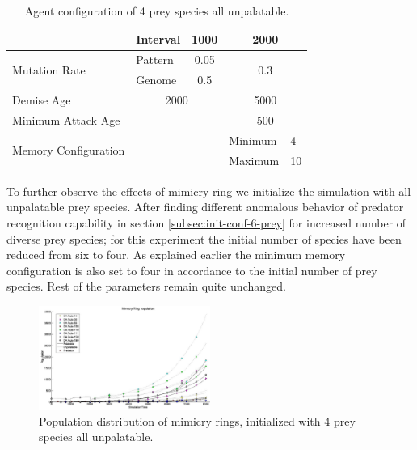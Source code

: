 \documentclass[letterpaper]{article}
\numberwithin{equation}{section}
\begin{document}
\begin{table}[h]
\begin{tabular}{| p{2cm} | p{1.5cm} | p{1cm} | p{.5cm} | p{1.5cm} | p{.5cm} |}
  						 									& Interval  & \multicolumn{2}{c|}{1000} & \multicolumn{2}{c|}{2000} \\ \hline
  \multirow{2}{*}{Mutation Rate} & Pattern   & \multicolumn{2}{c|}{0.05} & \multicolumn{2}{c|}{\multirow{2}{*}{0.3}} \\ \cline{2-4}
  						 									 & Genome    & \multicolumn{2}{c|}{0.5}  & \multicolumn{2}{c|}{} \\ \hline
  Demise Age	 									 & \multicolumn{3}{c|}{2000}							& \multicolumn{2}{c|}{5000} \\ \hline
  Minimum Attack Age						 & \multicolumn{3}{c|}{} 						    & \multicolumn{2}{c|}{500} \\ \hline
  \multirow{2}{*}{\parbox{2cm}{Memory Configuration}} & \multicolumn{3}{c|}{} 					& Minimum & 4 \\ \cline{5-6}
   																			& \multicolumn{3}{c|}{} 					& Maximum & 10 \\ \hline  
\end{tabular}
\caption{Agent configuration of 4 prey species all unpalatable.}
\label{tab:config-table-4-prey-unpalatable}
\end{table}

To further observe the effects of mimicry ring we initialize the simulation with all unpalatable prey species. After finding different anomalous behavior of predator recognition capability in section \ref{subsec:init-conf-6-prey} for increased number of diverse prey species; for this experiment the initial number of species have been reduced from six to four. As explained earlier the minimum memory configuration is also set to four in accordance to the initial number of prey species. Rest of the parameters remain quite unchanged.

\begin{figure}[H]
	\centering
	\includegraphics[width=0.5\textwidth]{../tex/images/simTime8k-4Prey-unp}
	\caption[Population distribution of mimicry rings(4 prey species all unpalatable)]{Population distribution of mimicry rings, initialized with 4 prey species all unpalatable.}
	\label{fig:plot-4-prey-unp}
\end{figure}
\end{document}
